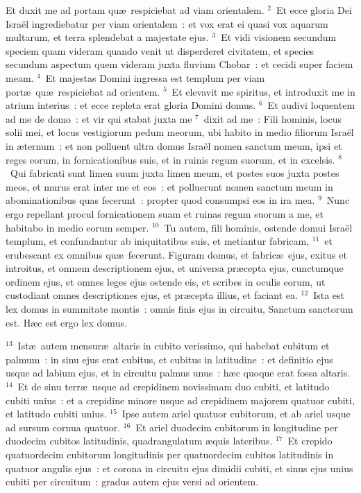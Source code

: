 \bchapter
\lettrine[lines=3,image=true,loversize=0.05,lraise=-0.03]{E}{}t duxit me ad portam qu\ae\ respiciebat ad viam orientalem.
${}^{2}$~Et ecce gloria Dei Isra\"el ingrediebatur per viam orientalem~: et vox erat ei quasi vox aquarum multarum, et terra splendebat a majestate ejus.
${}^{3}$~Et vidi visionem secundum speciem quam videram quando venit ut disperderet civitatem, et species secundum aspectum quem videram juxta fluvium Chobar~: et cecidi super faciem meam.
${}^{4}$~Et majestas Domini ingressa est templum per viam port\ae\ qu\ae\ respiciebat ad orientem.
${}^{5}$~Et elevavit me spiritus, et introduxit me in atrium interius~: et ecce repleta erat gloria Domini domus.
${}^{6}$~Et audivi loquentem ad me de domo~: et vir qui stabat juxta me
${}^{7}$~dixit ad me~: Fili hominis, locus solii mei, et locus vestigiorum pedum meorum, ubi habito in medio filiorum Isra\"el in \ae ternum~: et non polluent ultra domus Isra\"el nomen sanctum meum, ipsi et reges eorum, in fornicationibus suis, et in ruinis regum suorum, et in excelsis.
${}^{8}$~Qui fabricati sunt limen suum juxta limen meum, et postes suos juxta postes meos, et murus erat inter me et eos~: et polluerunt nomen sanctum meum in abominationibus quas fecerunt~: propter quod consumpsi eos in ira mea.
${}^{9}$~Nunc ergo repellant procul fornicationem suam et ruinas regum suorum a me, et habitabo in medio eorum semper.
${}^{10}$~Tu autem, fili hominis, ostende domui Isra\"el templum, et confundantur ab iniquitatibus suis, et metiantur fabricam,
${}^{11}$~et erubescant ex omnibus qu\ae\ fecerunt. Figuram domus, et fabric\ae\ ejus, exitus et introitus, et omnem descriptionem ejus, et universa pr\ae cepta ejus, cunctumque ordinem ejus, et omnes leges ejus ostende eis, et scribes in oculis eorum, ut custodiant omnes descriptiones ejus, et pr\ae cepta illius, et faciant ea.
${}^{12}$~Ista est lex domus in summitate montis~: omnis finis ejus in circuitu, Sanctum sanctorum est. H\ae c est ergo lex domus.


${}^{13}$~Ist\ae\ autem mensur\ae\ altaris in cubito verissimo, qui habebat cubitum et palmum~: in sinu ejus erat cubitus, et cubitus in latitudine~: et definitio ejus usque ad labium ejus, et in circuitu palmus unus~: h\ae c quoque erat fossa altaris.
${}^{14}$~Et de sinu terr\ae\ usque ad crepidinem novissimam duo cubiti, et latitudo cubiti unius~: et a crepidine minore usque ad crepidinem majorem quatuor cubiti, et latitudo cubiti unius.
${}^{15}$~Ipse autem ariel quatuor cubitorum, et ab ariel usque ad sursum cornua quatuor.
${}^{16}$~Et ariel duodecim cubitorum in longitudine per duodecim cubitos latitudinis, quadrangulatum \ae quis lateribus.
${}^{17}$~Et crepido quatuordecim cubitorum longitudinis per quatuordecim cubitos latitudinis in quatuor angulis ejus~: et corona in circuitu ejus dimidii cubiti, et sinus ejus unius cubiti per circuitum~: gradus autem ejus versi ad orientem.


